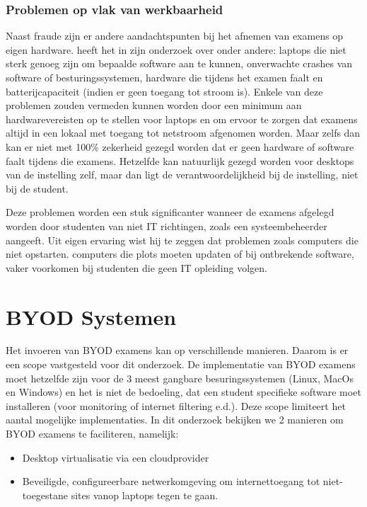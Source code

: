 \subsubsection{Problemen op vlak van werkbaarheid}
Naast fraude zijn er andere aandachtspunten bij het afnemen van examens op eigen hardware. \textcite{Hillier2015} heeft het in zijn onderzoek over onder andere: laptops die niet sterk genoeg zijn om bepaalde software aan te kunnen, onverwachte crashes van software of besturingssystemen, hardware die tijdens het examen faalt en batterijcapaciteit (indien er geen toegang tot stroom is). Enkele van deze problemen zouden vermeden kunnen worden door een minimum aan hardwarevereisten op te stellen voor laptops en om ervoor te zorgen dat examens altijd in een lokaal met toegang tot netstroom afgenomen worden. Maar zelfs dan kan er niet met 100\% zekerheid gezegd worden dat er geen hardware of software faalt tijdens die examens. Hetzelfde kan natuurlijk gezegd worden voor desktops van de instelling zelf, maar dan ligt de verantwoordelijkheid bij de instelling, niet bij de student. 

Deze problemen worden een stuk significanter wanneer de examens afgelegd worden door studenten van niet IT richtingen, zoals een systeembeheerder aangeeft. Uit eigen ervaring wist hij te zeggen dat problemen zoals computers die niet opstarten. computers die plots moeten updaten of bij ontbrekende software,  vaker voorkomen bij studenten die geen IT opleiding volgen. 


    
\section{BYOD Systemen}

Het invoeren van BYOD examens kan op verschillende manieren. Daarom is er een scope vastgesteld voor dit onderzoek. De implementatie van BYOD examens moet hetzelfde zijn voor de 3 meest gangbare besuringssystemen (Linux, MacOs en Windows) en het is niet de bedoeling, dat een student specifieke software moet installeren (voor monitoring of internet filtering e.d.). Deze scope limiteert het aantal mogelijke implementaties. In dit onderzoek bekijken we 2 manieren om BYOD examens te faciliteren, namelijk:

\begin{itemize} 
\item Desktop virtualisatie via een cloudprovider
\item Beveiligde, configureerbare netwerkomgeving om internettoegang tot niet-toegestane sites vanop laptops tegen te gaan.	
\end{itemize}

